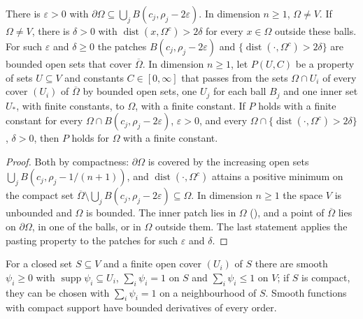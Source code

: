 \begin{lemma}
\label{lem:bounded-lipschitz-geometry}
\leanok
{}
There is $\varepsilon > 0$ with $\partial\Omega \subseteq \bigcup_j B(c_j, \rho_j - 2\varepsilon)$.
In dimension $n \geq 1$, $\Omega \neq V$. If $\Omega \neq V$, there is $\delta > 0$ with
$\operatorname{dist}(x, \Omega^c) > 2\delta$ for every $x \in \Omega$ outside these balls. For
such $\varepsilon$ and $\delta \geq 0$ the patches $B(c_j, \rho_j - 2\varepsilon)$ and
$\{\operatorname{dist}(\cdot, \Omega^c) > 2\delta\}$ are bounded open sets that cover
$\overline\Omega$. In dimension $n \geq 1$, let $P(U, C)$ be a property of sets $U \subseteq V$ and
constants $C \in [0, \infty]$ that passes from the sets $\Omega \cap U_i$ of every cover
$(U_i)$ of $\overline\Omega$ by bounded open sets, one $U_j$ for each ball $B_j$ and one inner
set $U_\ast$, with finite constants, to $\Omega$, with a finite constant. If $P$ holds with a
finite constant for every $\Omega \cap B(c_j, \rho_j - 2\varepsilon)$, $\varepsilon > 0$, and every
$\Omega \cap \{\operatorname{dist}(\cdot, \Omega^c) > 2\delta\}$, $\delta > 0$, then $P$ holds for
$\Omega$ with a finite constant.
\end{lemma}

\begin{proof}
\leanok
Both by compactness: $\partial\Omega$ is covered by the increasing open sets
$\bigcup_j B(c_j, \rho_j - 1/(n+1))$, and $\operatorname{dist}(\cdot, \Omega^c)$ attains a positive
minimum on the compact set $\overline{\Omega} \setminus \bigcup_j B(c_j, \rho_j - 2\varepsilon)
\subseteq \Omega$. In dimension $n \geq 1$ the space $V$ is unbounded and $\Omega$ is bounded.
The inner patch lies in $\Omega$ (), and a point of $\overline\Omega$ lies on
$\partial\Omega$, in one of the balls, or in $\Omega$ outside them. The last statement applies the
pasting property to the patches for such $\varepsilon$ and $\delta$.
\end{proof}

\begin{lemma}
\label{lem:resolution-of-unity}
\leanok
For a closed set $S \subseteq V$ and a finite open cover $(U_i)$ of $S$ there are smooth
$\psi_i \geq 0$ with $\operatorname{supp} \psi_i \subseteq U_i$, $\sum_i \psi_i = 1$ on $S$ and
$\sum_i \psi_i \leq 1$ on $V$; if $S$ is compact, they can be chosen with $\sum_i \psi_i = 1$ on a
neighbourhood of $S$. Smooth functions with compact support have bounded derivatives of every
order.
\end{lemma}

